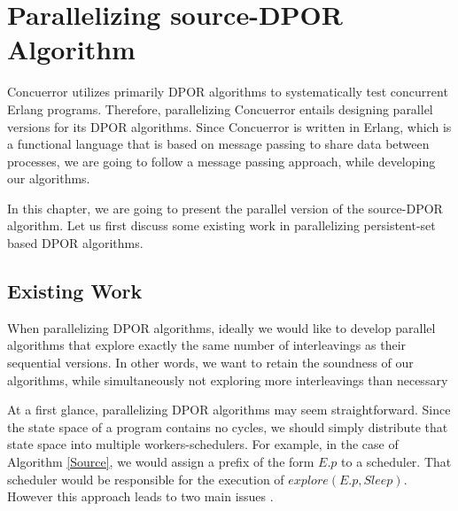 \chapter{Parallelizing source-DPOR Algorithm}
\label{paradpor}

Concuerror utilizes primarily DPOR algorithms to systematically test concurrent Erlang programs. 
Therefore, parallelizing Concuerror entails designing parallel versions for its DPOR algorithms. 
Since Concuerror is written in Erlang, which is a functional language that is based on message passing to share 
data between processes, we are going to follow a message passing approach, while developing our algorithms.

In this chapter, we are going to present the parallel version of the source-DPOR algorithm. Let us first
discuss some existing work in parallelizing persistent-set based DPOR algorithms.

\section{Existing Work}

When parallelizing DPOR algorithms, ideally we would like to develop parallel algorithms that explore
exactly the same number of interleavings as their sequential versions. In other words, we want to retain
the soundness of our algorithms, while simultaneously not exploring more interleavings than necessary

At a first glance, parallelizing DPOR algorithms may seem straightforward. Since the state space of a program contains no cycles, 
we should simply distribute that state space into multiple workers-schedulers. For example, in the case of Algorithm \ref{Source}, 
we would assign a prefix of the form $E.p$ to a scheduler. That scheduler would be responsible for the execution of $explore(E.p, Sleep)$.
However this approach leads to two main issues \cite{Yang:2007:DDP:1770532.1770541}.

